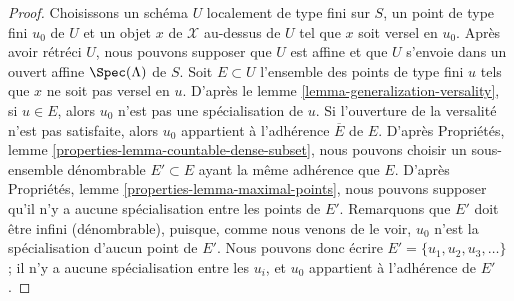 \begin{proof}
Choisissons un schéma $U$ localement de type fini sur $S$, un point de type
fini $u_0$ de $U$ et un objet $x$ de $\mathcal{X}$ au-dessus de $U$ tel que
$x$ soit versel en $u_0$. Après avoir rétréci $U$, nous pouvons supposer que
$U$ est affine et que $U$ s'envoie dans un ouvert affine $\Spec(\Lambda)$ de $S$.
Soit $E \subset U$ l'ensemble des points de type fini $u$ tels que $x$ ne
soit pas versel en $u$. D'après le lemme
\ref{lemma-generalization-versality}, si $u \in E$, alors $u_0$ n'est pas une
spécialisation de $u$. Si l'ouverture de la versalité n'est pas satisfaite,
alors $u_0$ appartient à l'adhérence $\overline{E}$ de $E$. D'après
Propriétés, lemme \ref{properties-lemma-countable-dense-subset}, nous pouvons
choisir un sous-ensemble dénombrable $E' \subset E$ ayant la même adhérence
que $E$. D'après Propriétés, lemme \ref{properties-lemma-maximal-points}, nous
pouvons supposer qu'il n'y a aucune spécialisation entre les points de $E'$.
Remarquons que $E'$ doit être infini (dénombrable), puisque, comme nous venons
de le voir, $u_0$ n'est la spécialisation d'aucun point de $E'$. Nous pouvons
donc écrire $E' = \{u_1, u_2, u_3, \ldots\}$ ; il n'y a aucune
spécialisation entre les $u_i$, et $u_0$ appartient à l'adhérence de $E'$.


\end{proof}
